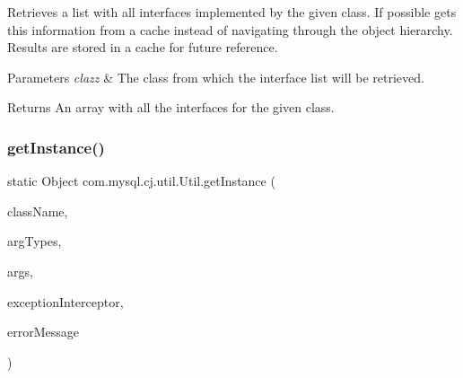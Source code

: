 Retrieves a list with all interfaces implemented by the given class. If possible gets this information from a cache instead of navigating through the object hierarchy. Results are stored in a cache for future reference.


\begin{DoxyParams}{Parameters}
{\em clazz} & The class from which the interface list will be retrieved. \\
\hline
\end{DoxyParams}
\begin{DoxyReturn}{Returns}
An array with all the interfaces for the given class. 
\end{DoxyReturn}
\mbox{\label{classcom_1_1mysql_1_1cj_1_1util_1_1_util_a2596886e40a0b168c30d81fe2777a583}} 
\subsubsection{\texorpdfstring{get\+Instance()}{getInstance()}\hspace{0.1cm}{\footnotesize\ttfamily [1/2]}}
{\footnotesize\ttfamily static Object com.\+mysql.\+cj.\+util.\+Util.\+get\+Instance (\begin{DoxyParamCaption}\item[{String}]{class\+Name,  }\item[{Class$<$?$>$ \mbox{[}$\,$\mbox{]}}]{arg\+Types,  }\item[{Object \mbox{[}$\,$\mbox{]}}]{args,  }\item[{\mbox{\hyperlink{interfacecom_1_1mysql_1_1cj_1_1exceptions_1_1_exception_interceptor}{Exception\+Interceptor}}}]{exception\+Interceptor,  }\item[{String}]{error\+Message }\end{DoxyParamCaption})\hspace{0.3cm}{\ttfamily [static]}}

\mbox{\label{classcom_1_1mysql_1_1cj_1_1util_1_1_util_a73976bd0506adf686764aa027e085bb3}} 

